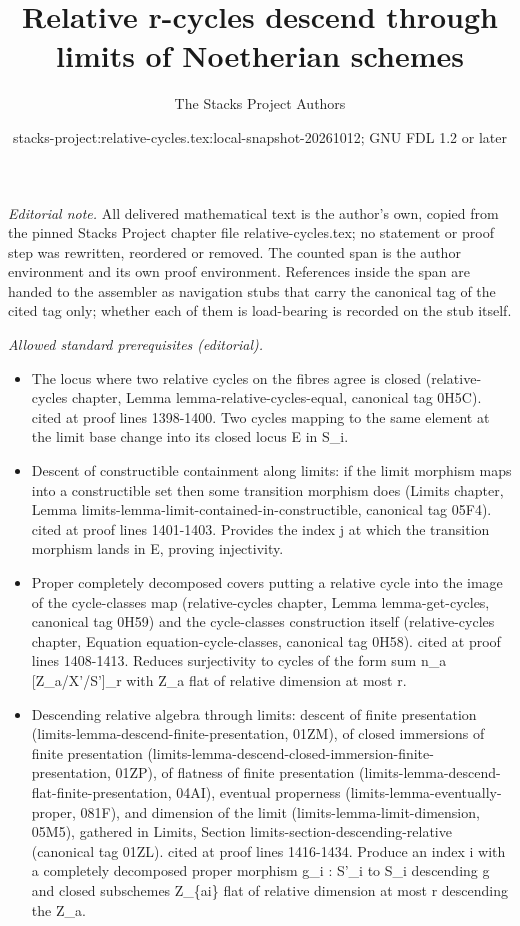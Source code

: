 \documentclass{stacks-project}
\title{Relative r-cycles descend through limits of Noetherian schemes}
\author{The Stacks Project Authors}
\date{stacks-project:relative-cycles.tex:local-snapshot-20261012; GNU FDL 1.2 or later}
\theoremstyle{plain}
\theoremstyle{definition}
\theoremstyle{remark}
\numberwithin{equation}{subsection}
\begin{document}
\maketitle
\setcounter{subsection}{1}
\noindent\textit{Editorial note.} All delivered mathematical text is the author's own, copied from the pinned Stacks Project chapter file relative-cycles.tex; no statement or proof step was rewritten, reordered or removed. The counted span is the author environment and its own proof environment. References inside the span are handed to the assembler as navigation stubs that carry the canonical tag of the cited tag only; whether each of them is load-bearing is recorded on the stub itself.\par\medskip
\noindent\textit{Allowed standard prerequisites (editorial).}\begin{itemize}
\item The locus where two relative cycles on the fibres agree is closed (relative-cycles chapter, Lemma lemma-relative-cycles-equal, canonical tag 0H5C). cited at proof lines 1398-1400. Two cycles mapping to the same element at the limit base change into its closed locus E in S\_i.
\item Descent of constructible containment along limits: if the limit morphism maps into a constructible set then some transition morphism does (Limits chapter, Lemma limits-lemma-limit-contained-in-constructible, canonical tag 05F4). cited at proof lines 1401-1403. Provides the index j at which the transition morphism lands in E, proving injectivity.
\item Proper completely decomposed covers putting a relative cycle into the image of the cycle-classes map (relative-cycles chapter, Lemma lemma-get-cycles, canonical tag 0H59) and the cycle-classes construction itself (relative-cycles chapter, Equation equation-cycle-classes, canonical tag 0H58). cited at proof lines 1408-1413. Reduces surjectivity to cycles of the form sum n\_a [Z\_a/X'/S']\_r with Z\_a flat of relative dimension at most r.
\item Descending relative algebra through limits: descent of finite presentation (limits-lemma-descend-finite-presentation, 01ZM), of closed immersions of finite presentation (limits-lemma-descend-closed-immersion-finite-presentation, 01ZP), of flatness of finite presentation (limits-lemma-descend-flat-finite-presentation, 04AI), eventual properness (limits-lemma-eventually-proper, 081F), and dimension of the limit (limits-lemma-limit-dimension, 05M5), gathered in Limits, Section limits-section-descending-relative (canonical tag 01ZL). cited at proof lines 1416-1434. Produce an index i with a completely decomposed proper morphism g\_i : S'\_i to S\_i descending g and closed subschemes Z\_\{ai\} flat of relative dimension at most r descending the Z\_a.

\end{itemize}
\end{document}
